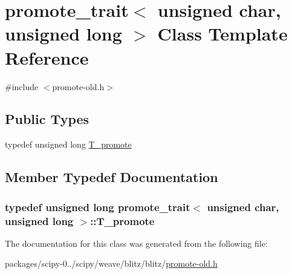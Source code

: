 \hypertarget{classpromote__trait_3_01unsigned_01char_00_01unsigned_01long_01_4}{}\section{promote\+\_\+trait$<$ unsigned char, unsigned long $>$ Class Template Reference}
\label{classpromote__trait_3_01unsigned_01char_00_01unsigned_01long_01_4}


{\ttfamily \#include $<$promote-\/old.\+h$>$}

\subsection*{Public Types}
\begin{DoxyCompactItemize}
\item 
typedef unsigned long \hyperlink{classpromote__trait_3_01unsigned_01char_00_01unsigned_01long_01_4_a2919b292586bd78dac73bb51cdfb1a17}{T\+\_\+promote}
\end{DoxyCompactItemize}


\subsection{Member Typedef Documentation}
\hypertarget{classpromote__trait_3_01unsigned_01char_00_01unsigned_01long_01_4_a2919b292586bd78dac73bb51cdfb1a17}{}
\subsubsection[{T\+\_\+promote}]{\setlength{\rightskip}{0pt plus 5cm}typedef unsigned long {\bf promote\+\_\+trait}$<$ unsigned char, unsigned long $>$\+::{\bf T\+\_\+promote}}\label{classpromote__trait_3_01unsigned_01char_00_01unsigned_01long_01_4_a2919b292586bd78dac73bb51cdfb1a17}


The documentation for this class was generated from the following file\+:\begin{DoxyCompactItemize}
\item 
packages/scipy-\/0../scipy/weave/blitz/blitz/\hyperlink{promote-old_8h}{promote-\/old.\+h}\end{DoxyCompactItemize}
